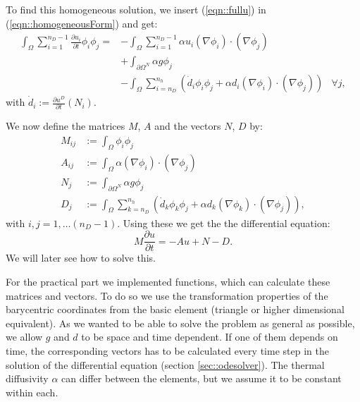 To find this homogeneous solution, we insert (\ref{eqn::fullu}) in (\ref{eqn::homogeneousForm}) and get:
\begin{equation}
\label{eqn::finalDiscreticedForm}
\begin{aligned}
	\int_{\Omega} \sum_{i=1}^{n_D-1} \frac{\partial u_i}{\partial t} \phi_i \phi_j = &-\int_{\Omega} \sum_{i=1}^{n_D-1} \alpha u_i(\nabla \phi_i) \cdot (\nabla \phi_j) \\
	&+ \int_{\partial\Omega^N} \alpha g\phi_j \\
	&-	\int_{\Omega} \sum_{i=n_D}^{n_h}\left( \dot{d}_i \phi_i \phi_j  + \alpha d_i(\nabla \phi_i) \cdot (\nabla \phi_j)\right)
	 & \forall j,
\end{aligned}
\end{equation}
with $\dot{d}_i:=\frac{\partial u^D}{\partial t}(N_i)$.

We now define the matrices $M$, $A$ and the vectors $N$, $D$ by:
\begin{align*}
	M_{ij} &:=\int_{\Omega} \phi_i \phi_j \\
	A_{ij} &:=\int_{\Omega} \alpha (\nabla \phi_i) \cdot (\nabla \phi_j) \\
	N_{j} &:=\int_{\partial\Omega^N} \alpha g\phi_j \\
	D_{j} &:=\int_{\Omega} \sum_{k=n_D}^{n_h}\left( \dot{d}_k \phi_k \phi_j  + \alpha d_k(\nabla \phi_k) \cdot (\nabla \phi_j)\right),
\end{align*}
with $i,j=1,\dots (n_D-1)$. Using these we get the the differential equation:
\begin{equation}
	\label{eqn::matrixForm}
	M\frac{\partial u}{\partial t} = -A u + N - D.
\end{equation}
We will later see how to solve this.

For the practical part we implemented functions, which can calculate these matrices and vectors. To do so we use the transformation properties of the barycentric coordinates from the basic element (triangle or higher dimensional equivalent). As we wanted to be able to solve the problem as general as possible, we allow $g$ and $d$ to be space and time dependent. If one of them depends on time, the corresponding vectors has to be calculated every time step in the solution of the differential equation (section \ref{sec::odesolver}). The thermal diffusivity $\alpha$ can differ between the elements, but we assume it to be constant within each.